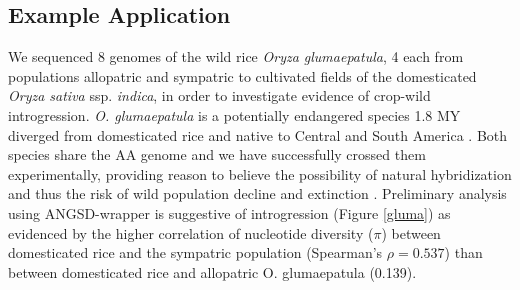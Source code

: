 \documentclass[final]{beamer}
\begin{document}
\begin{frame}[t]
\begin{multicols}{3}
%         
%		

\section{Example Application}

We sequenced 8 genomes of the wild rice \emph{Oryza glumaepatula}, 4 each from populations allopatric and sympatric to cultivated fields of the domesticated \emph{Oryza sativa} ssp. \emph{indica}, in order to investigate evidence of crop-wild introgression. 
\emph{O. glumaepatula} is a potentially endangered species 1.8 MY diverged from domesticated rice \cite{Zhang} and native to Central and South America \cite{Vaughan}. 
Both species share the AA genome \cite{Vaughan} and we have successfully crossed them experimentally, providing reason to believe the possibility of natural hybridization and thus the risk of wild population decline and extinction \cite{Rhymer}. 
Preliminary analysis using ANGSD-wrapper is suggestive of introgression (Figure \ref{gluma}) as evidenced by the higher correlation of nucleotide diversity ($\pi$) between domesticated rice and the sympatric population (Spearman's $\rho=0.537$) than between domesticated rice and allopatric O. glumaepatula (0.139).


\end{multicols}
\end{frame}
\end{document}
